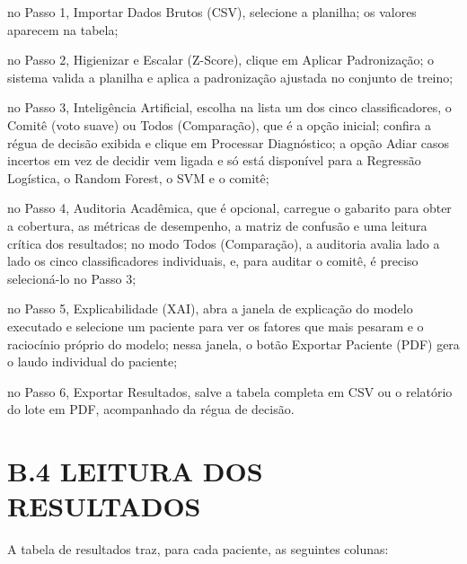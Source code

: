 \documentclass[
    12pt
    ,oneside
    ,a4paper
    ,chapter=TITLE
    ,section=TITLE
    ,sumario=abnt-6027-2012
    ,english,brazil]{abntex2} %
\begin{document}
\begin{alineas}
    \item no Passo 1, Importar Dados Brutos (CSV), selecione a planilha; os
          valores aparecem na tabela;
    \item no Passo 2, Higienizar e Escalar (Z-Score), clique em Aplicar
          Padronização; o sistema valida a planilha e aplica a padronização
          ajustada no conjunto de treino;
    \item no Passo 3, Inteligência Artificial, escolha na lista um dos cinco
          classificadores, o Comitê (voto suave) ou Todos (Comparação), que é a
          opção inicial; confira a régua de decisão exibida e clique em
          Processar Diagnóstico; a opção Adiar casos incertos em vez de decidir
          vem ligada e só está disponível para a Regressão Logística, o Random
          Forest, o SVM e o comitê;
    \item no Passo 4, Auditoria Acadêmica, que é opcional, carregue o gabarito
          para obter a cobertura, as métricas de desempenho, a matriz de
          confusão e uma leitura crítica dos resultados; no modo Todos
          (Comparação), a auditoria avalia lado a lado os cinco
          classificadores individuais, e, para auditar o comitê, é preciso
          selecioná-lo no Passo 3;
    \item no Passo 5, Explicabilidade (XAI), abra a janela de explicação do
          modelo executado e selecione um paciente para ver os fatores que mais
          pesaram e o raciocínio próprio do modelo; nessa janela, o botão
          Exportar Paciente (PDF) gera o laudo individual do paciente;
    \item no Passo 6, Exportar Resultados, salve a tabela completa em CSV ou o
          relatório do lote em PDF, acompanhado da régua de decisão.
\end{alineas}

\section*{B.4 LEITURA DOS RESULTADOS}

A tabela de resultados traz, para cada paciente, as seguintes colunas:
\end{document}
